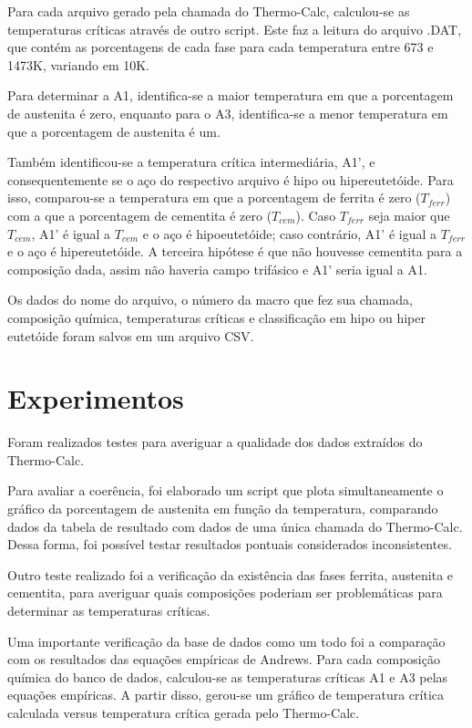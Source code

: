 \documentclass[brazil,tese,epusp]{usp}
\begin{document}
Para cada arquivo gerado pela chamada do Thermo-Calc\textregistered{}, calculou-se as temperaturas críticas através de outro script. Este faz a leitura do arquivo .DAT, que contém as porcentagens de cada fase para cada temperatura entre 673 e 1473K, variando em 10K.

Para determinar a A1, identifica-se a maior temperatura em que a porcentagem de austenita é zero, enquanto para o A3, identifica-se a menor temperatura em que a porcentagem de austenita é um.

Também identificou-se a temperatura crítica intermediária, A1', e consequentemente se o aço do respectivo arquivo é hipo ou hipereutetóide. Para isso, comparou-se a temperatura em que a porcentagem de ferrita é zero ($T_{ferr}$) com a que a porcentagem de cementita é zero ($T_{cem}$). Caso $T_{ferr}$ seja maior que $T_{cem}$, A1' é igual a $T_{cem}$ e o aço é hipoeutetóide; caso contrário, A1' é igual a $T_{ferr}$ e o aço é hipereutetóide. A terceira hipótese é que não houvesse cementita para a composição dada, assim não haveria campo trifásico e A1' seria igual a A1.

Os dados do nome do arquivo, o número da macro que fez sua chamada, composição química, temperaturas críticas e classificação em hipo ou hiper eutetóide foram salvos em um arquivo CSV.

\section{Experimentos}

Foram realizados testes para averiguar a qualidade dos dados extraídos do Thermo-Calc\textregistered{}.

Para avaliar a coerência, foi elaborado um script que plota simultaneamente o gráfico da porcentagem de austenita em função da temperatura, comparando dados da tabela de resultado com dados de uma única chamada do Thermo-Calc\textregistered{}. Dessa forma, foi possível testar resultados pontuais considerados inconsistentes.

Outro teste realizado foi a verificação da existência das fases ferrita, austenita e cementita, para averiguar quais composições poderiam ser problemáticas para determinar as temperaturas críticas.

Uma importante verificação da base de dados como um todo foi a comparação com os resultados das equações empíricas de Andrews. Para cada composição química do banco de dados, calculou-se as temperaturas críticas A1 e A3 pelas equações empíricas. A partir disso, gerou-se um gráfico de temperatura crítica calculada versus temperatura crítica gerada pelo Thermo-Calc\textregistered{}.
\end{document}
